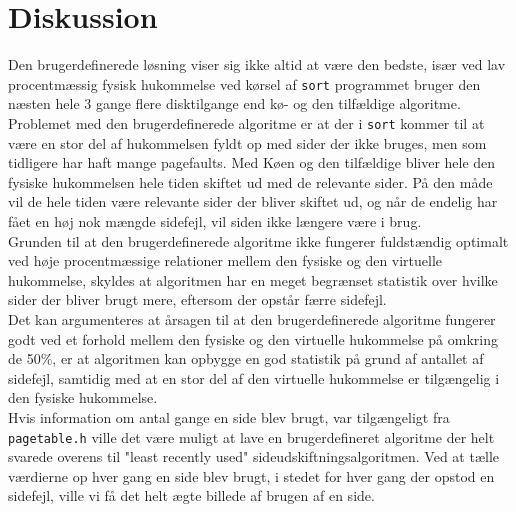 \section{Diskussion}
Den brugerdefinerede løsning viser sig ikke altid at være den bedste, især ved lav procentmæssig fysisk hukommelse ved kørsel af \texttt{sort} programmet bruger den næsten hele 3 gange flere disktilgange end kø- og den tilfældige algoritme. Problemet med den brugerdefinerede algoritme er at der i \texttt{sort} kommer til at være en stor del af hukommelsen fyldt op med sider der ikke bruges, men som tidligere har haft mange pagefaults. Med Køen og den tilfældige bliver hele den fysiske hukommelsen hele tiden skiftet ud med de relevante sider. På den måde vil de hele tiden være relevante sider der bliver skiftet ud, og når de endelig har fået en høj nok mængde sidefejl, vil siden ikke længere være i brug.\\

Grunden til at den brugerdefinerede algoritme ikke fungerer fuldstændig optimalt ved høje procentmæssige relationer mellem den fysiske og den virtuelle hukommelse, skyldes at algoritmen har en meget begrænset statistik over hvilke sider der bliver brugt mere, eftersom der opstår færre sidefejl.\\

Det kan argumenteres at årsagen til at den brugerdefinerede algoritme fungerer godt ved et forhold mellem den fysiske og den virtuelle hukommelse på omkring de 50\%, er at algoritmen kan opbygge en god statistik på grund af antallet af sidefejl, samtidig med at en stor del af den virtuelle hukommelse er tilgængelig i den fysiske hukommelse.\\

Hvis information om antal gange en side blev brugt, var tilgængeligt fra \texttt{pagetable.h} ville det være muligt at lave en brugerdefineret algoritme der helt svarede overens til "least recently used" sideudskiftningsalgoritmen. Ved at tælle værdierne op hver gang en side blev brugt, i stedet for hver gang der opstod en sidefejl, ville vi få det helt ægte billede af brugen af en side.